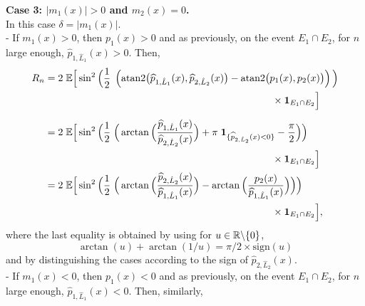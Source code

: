 \documentclass[11pt,a4paper,openany]{article}
\newcommand{\Atan}{\mbox{atan2}}
\def\R{\mathbb{R}}
\def\E{\mathbb{E}}
\begin{document}
\bigskip

\noindent
\textbf{Case 3: $|m_1(x)|>0$ and $m_2(x)=0$.}
\\[0.2cm]   
In this case $\delta=|m_1(x)|$.\\
- If $m_{1}(x)>0$, then $p_{1}(x) > 0$ and as previously, on the event $E_1  \cap E_2 $, for $n$ large enough, $ \widehat{p}_{1, \hat L_1}(x) > 0$. Then,
\begin{align*}
	R_n & = 2 \hspace{0.1cm}   \E \Big[ \sin^2 \Big( \frac{1}{2} \hspace{0.1cm}  \left (  \Atan \big( \widehat{p}_{1, \hat L_1}(x) ,   \widehat{p}_{2, \hat L_2}(x)\big)  -  \Atan \big( p_{1}(x), p_{2}(x)\big)  \right ) \Big)
	\\
	& \hspace{8cm} \times     \mathbf{1}_{E_1 \cap   E_2 } \Big]
	\\[0.2cm]  
	&= 2 \hspace{0.1cm}  \E \Big[ \sin^2 \Big( \frac{1}{2} \hspace{0.1cm}   \Big(  \arctan \Big( \dfrac{ \widehat{p}_{1, \hat L_1}(x)}{ \widehat{p}_{2, \hat L_2}(x)}  \Big) + \pi  \hspace{0.1cm}  \mathbf{1}_{ \{ \widehat{p}_{2, \hat L_2}(x) < 0 \} }  -  \frac{\pi}{2}  \Big) \Big) 
	\\
	& \hspace{8cm} \times   \mathbf{1}_{E_1 \cap   E_2 } \Big]
	\\
	&= 2 \hspace{0.1cm}  \E \Big[ \sin^2 \Big( \frac{1}{2} \hspace{0.1cm}   \Big(  \arctan \Big( \dfrac{ \widehat{p}_{2, \hat L_2}(x)}{ \widehat{p}_{1, \hat L_1}(x)}  \Big)  -  \arctan \Big( \dfrac{ p_{2}(x)}{ \widehat{p}_{1, \hat L_1}(x)}  \Big) \Big) \Big) 
	\\
	& \hspace{8cm} \times   \mathbf{1}_{E_1 \cap  E_2 } \Big],
\end{align*}
where the last equality is obtained by using for $u \in \R \char92 \{0\}$, 
$$\arctan(u)+\arctan(1/u)=\pi/2\times \textrm{sign}(u)$$ and by distinguishing the cases according to the sign of $ \widehat{p}_{2, \hat L_2}(x)$.
\\
- If $m_1(x) < 0$, then $p_{1}(x) < 0$ and as previously, on the event $E_1 \cap   E_2$, for $n$ large enough, $ \widehat{p}_{1, \hat L_1}(x) < 0$. Then, similarly,
\end{document}
